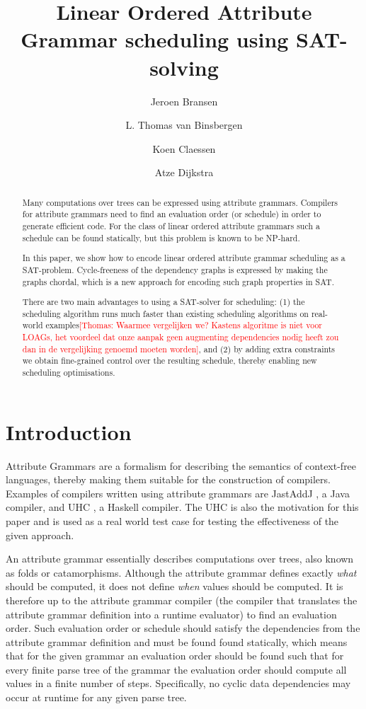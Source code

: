 \documentclass{llncs}
\title{Linear Ordered Attribute Grammar scheduling using SAT-solving}
\author{Jeroen Bransen\inst{1}  \and L. Thomas van Binsbergen\inst{2,1} \and Koen Claessen\inst{3} \and Atze Dijkstra\inst{1}}
\institute{Utrecht University, Utrecht, The Netherlands, \email{\{J.Bransen,atze\}@uu.nl}
\and Royal Holloway, University of London, Egham, UK, \email{Thomas.VanBinsbergen.2014@live.rhul.ac.uk}
\and Chalmers University of Technology, Gothenburg, Sweden, \email{koen@chalmers.se}}
\newif\iffinal\finalfalse
\newcommand{\REM}[3]{\iffinal\else\textcolor{#2}{[#1: #3]}\fi}
\newcommand{\Thomas}[1]{\REM{Thomas}{red}{#1}}
\begin{document}
\maketitle

\begin{abstract}
Many computations over trees can be expressed using attribute
grammars. Compilers for attribute grammars need to find an evaluation
order (or schedule) in order to generate efficient code. For the class
of linear ordered attribute grammars such a schedule can be found
statically, but this problem is known to be NP-hard.

In this paper, we show how to encode linear ordered attribute grammar
scheduling as a SAT-problem. Cycle-freeness of the dependency graphs
is expressed by making the graphs chordal, which is a new approach for
encoding such graph properties in SAT.

There are two main advantages to using a SAT-solver for scheduling:
(1) the scheduling algorithm runs much faster than existing scheduling
algorithms on real-world examples\Thomas{Waarmee vergelijken we? 
Kastens algoritme is niet voor LOAGs, het voordeel dat onze aanpak geen 
augmenting dependencies nodig heeft zou dan in de vergelijking genoemd moeten 
worden}, and (2) by adding extra constraints
we obtain fine-grained control over the resulting schedule, thereby
enabling new scheduling optimisations.


\end{abstract}

\section{Introduction}
Attribute Grammars \cite{knuth68} are a formalism for describing the semantics of context-free languages, thereby making them suitable for the construction of compilers. Examples of compilers written using attribute grammars are JastAddJ \cite{Ekman:2007}, a Java compiler, and UHC \cite{Dijkstra:2009}, a Haskell compiler. The UHC is also the motivation for this paper and is used as a real world test case for testing the effectiveness of the given approach.

An attribute grammar essentially describes computations over trees, also known as folds or catamorphisms. Although the attribute grammar defines exactly \emph{what} should be computed, it does not define \emph{when} values should be computed. It is therefore up to the attribute grammar compiler (the compiler that translates the attribute grammar definition into a runtime evaluator) to find an evaluation order. Such evaluation order or schedule should satisfy the dependencies from the attribute grammar definition and must be found found statically, which means that for the given grammar an evaluation order should be found such that for every finite parse tree of the grammar the evaluation order should compute all values in a finite number of steps. Specifically, no cyclic data dependencies may occur at runtime for any given parse tree.
\end{document}
